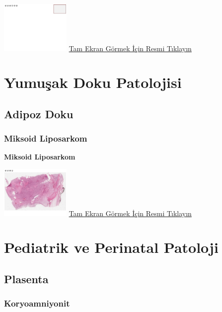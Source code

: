 \documentclass[
  letterpaper,
  DIV=11,
  numbers=noendperiod]{scrreprt}
\begin{document}
\href{https://images.patolojiatlasi.com/template/HE.html}{\includegraphics[width=0.25\textwidth,height=\textheight]{./screenshots/template_screenshot.png}}
\href{https://images.patolojiatlasi.com/exostosis/oc002.html}{Tam Ekran
Görmek İçin Resmi Tıklayın}

\part{Yumuşak Doku Patolojisi}

\hypertarget{sec-adipoz-doku}{%
\chapter{Adipoz Doku}\label{sec-adipoz-doku}}

\hypertarget{sec-miksoid-liposarkom}{%
\section{Miksoid Liposarkom}\label{sec-miksoid-liposarkom}}

\textbf{Miksoid Liposarkom}

\href{https://images.patolojiatlasi.com/myxoidliposarcoma/HE.html}{\includegraphics[width=0.25\textwidth,height=\textheight]{./screenshots/myxoidliposarcoma_screenshot.png}}
\href{https://images.patolojiatlasi.com/myxoidliposarcoma/HE.html}{Tam
Ekran Görmek İçin Resmi Tıklayın}

\part{Pediatrik ve Perinatal Patoloji}

\hypertarget{sec-plasenta}{%
\chapter{Plasenta}\label{sec-plasenta}}

\hypertarget{sec-koryoamniyonit}{%
\section{Koryoamniyonit}\label{sec-koryoamniyonit}}
\end{document}
